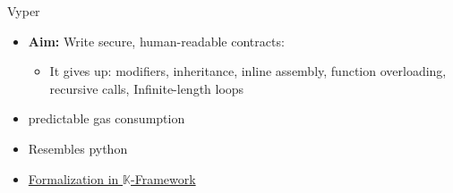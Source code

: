 \begin{frame}{Vyper~\cite{bib:vyper-docs}}

  \begin{itemize}
  	\item \textbf{Aim:} Write secure, human-readable  contracts:
  	\begin{itemize}
  		\item It gives up: modifiers, inheritance, inline assembly, function overloading, recursive calls, Infinite-length loops
  	\end{itemize}
    \item predictable gas consumption
    \item Resembles python
  	\item \href{https://github.com/kframework/vyper-semantics/}{Formalization in $\mathbb{K}$-Framework}
  \end{itemize}

\end{frame}
